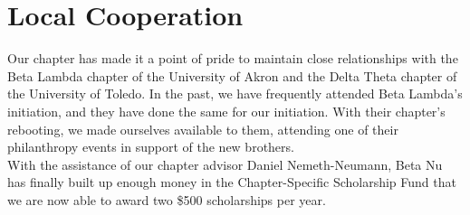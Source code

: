   \section*{Local Cooperation}
    Our chapter has made it a point of pride to maintain close relationships with the Beta Lambda chapter of the University of Akron and the Delta Theta chapter of the University of Toledo. In the past, we have frequently attended Beta Lambda's initiation, and they have done the same for our initiation. With their chapter's rebooting, we made ourselves available to them, attending one of their philanthropy events in support of the new brothers. \\
    
    With the assistance of our chapter advisor Daniel Nemeth-Neumann, Beta Nu has finally built up enough money in the Chapter-Specific Scholarship Fund that we are now able to award two \$500 scholarships per year.

 